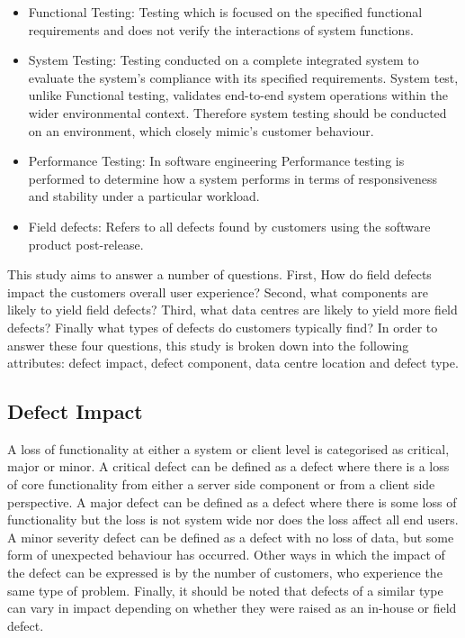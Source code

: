 \documentclass[conference]{IEEEtran}
\begin{document}
\begin{itemize}
 \item Functional Testing: Testing which is focused on the specified functional requirements and does not verify the interactions of system functions.
 \item System Testing: Testing conducted on a complete integrated system to evaluate the system's compliance with its specified requirements.  System test, unlike Functional testing, validates end-to-end system operations within the wider environmental context. Therefore system testing should be conducted on an environment, which closely mimic's customer behaviour.
 \item Performance Testing: In software engineering Performance testing is performed to determine how a system performs in terms of responsiveness and stability under a particular workload.
\item Field defects: Refers to all defects found by customers using the software product post-release.
\end{itemize}

This study aims to answer a number of questions. First, How do field defects impact the customers overall user experience? Second, what components are likely to yield field defects? Third, what data centres are likely to yield more field defects? Finally what types of defects do customers typically find?
In order to answer these four questions, this study is broken down into the following attributes: defect impact, defect component, data centre location and defect type.


\subsection{Defect Impact}

A loss of functionality at either a system or client level is categorised as critical, major or minor. A critical defect can be defined as a defect where there is a loss of core functionality from either a server side component or from a client side perspective. A major defect can be defined as a defect where there is some loss of functionality but the loss is not system wide nor does the loss affect all end users. A minor severity defect can be defined as a defect with no loss of data, but some form of unexpected behaviour has occurred.
Other ways in which the impact of the defect can be expressed is by the number of customers, who experience the same type of problem. Finally, it should be noted that defects of a similar type can vary in impact depending on whether they were raised as an in-house or field defect.
\end{document}
